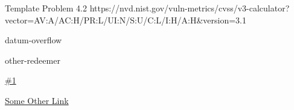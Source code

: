 \vuln
    { %
      Template Problem
    }
    { %
      4.2
    }
    { %
      https://nvd.nist.gov/vuln-metrics/cvss/v3-calculator?vector=AV:A/AC:H/PR:L/UI:N/S:U/C:L/I:H/A:H&version=3.1
    }
    { %
    \item datum-overflow
    \item other-redeemer
    }
    { %
      \lipsum[2]
    }
    { %
      \lipsum[1]
    }
    { %
      \lipsum[1]
    }
    { %
    \item\href{github.com}{\#1}
    \item\href{github.com}{Some Other Link}
    }
